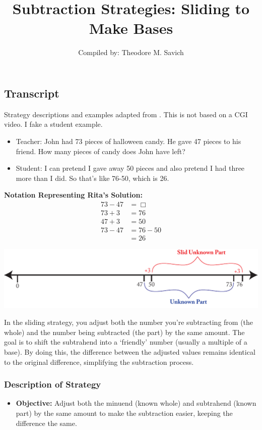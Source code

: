 \documentclass[11pt]{article}
\title{Subtraction Strategies: Sliding to Make Bases}
\author{Compiled by: Theodore M. Savich}
\begin{document}
\maketitle
\subsection*{Transcript}
 Strategy descriptions and examples adapted from \textcite{HackenbergCourseNotes}. This is not based on a CGI video. I fake a student example. 

\begin{itemize}
\item Teacher: John had 73 pieces of halloween candy. He gave 47 pieces to his friend. How many pieces of candy does John have left?
\item Student: I can pretend I gave away 50 pieces and also pretend I had three more than I did. So that's like 76-50, which is 26. 
\end{itemize}

\noindent \textbf{Notation Representing Rita's Solution:}
\begin{align*}
    73 - 47 &= \Box\\
    73+3 &= 76\\
    47+3 &= 50\\
    73 - 47 &= 76 - 50\\
    &= 26
\end{align*}

\includegraphics[width=.8\textwidth]{images/Easy_Pictures/SAR_SUB_Sliding/PDF/SAR_SUB_Sliding.pdf}

\noindent In the sliding strategy, you adjust both the number you’re subtracting from (the whole) and the number being subtracted (the part) by the same amount. The goal is to shift the subtrahend into a `friendly' number (usually a multiple of a base). By doing this, the difference between the adjusted values remains identical to the original difference, simplifying the subtraction process.


\subsubsection*{Description of Strategy}
\begin{itemize}
    \item \textbf{Objective:} Adjust both the minuend (known whole) and subtrahend (known part) by the same amount to make the subtraction easier, keeping the difference the same.
\end{itemize}
\end{document}

